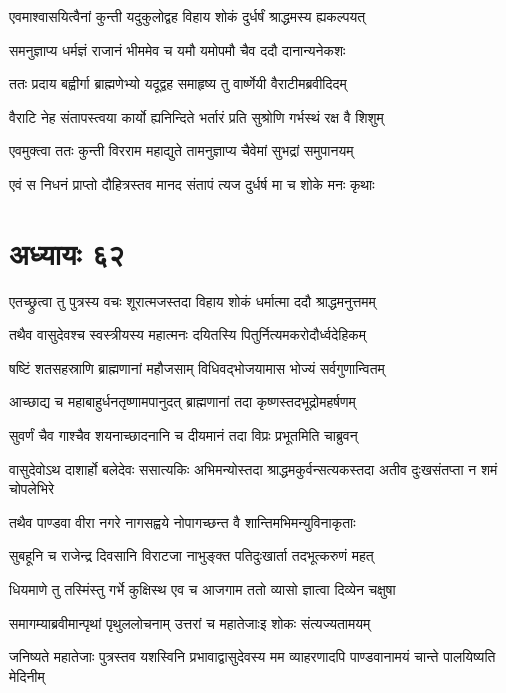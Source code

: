 \twolineshloka
{एवमाश्वासयित्वैनां कुन्ती यदुकुलोद्वह}
{विहाय शोकं दुर्धर्षं श्राद्धमस्य ह्यकल्पयत्}


\twolineshloka
{समनुज्ञाप्य धर्मज्ञं राजानं भीममेव च}
{यमौ यमोपमौ चैव ददौ दानान्यनेकशः}


\twolineshloka
{ततः प्रदाय बह्वीर्गा ब्राह्मणेभ्यो यदूद्वह}
{समाहृष्य तु वार्ष्णेयी वैराटीमब्रवीदिदम्}


\twolineshloka
{वैराटि नेह संतापस्त्वया कार्यो ह्यनिन्दिते}
{भर्तारं प्रति सुश्रोणि गर्भस्थं रक्ष वै शिशुम्}


\twolineshloka
{एवमुक्त्वा ततः कुन्ती विरराम महाद्युते}
{तामनुज्ञाप्य चैवेमां सुभद्रां समुपानयम्}


\twolineshloka
{एवं स निधनं प्राप्तो दौहित्रस्तव मानद}
{संतापं त्यज दुर्धर्ष मा च शोके मनः कृथाः}


\chapter{अध्यायः ६२}
\twolineshloka
{एतच्छ्रुत्वा तु पुत्रस्य वचः शूरात्मजस्तदा}
{विहाय शोकं धर्मात्मा ददौ श्राद्धमनुत्तमम्}


\twolineshloka
{तथैव वासुदेवश्च स्वस्त्रीयस्य महात्मनः}
{दयितस्यि पितुर्नित्यमकरोदौर्ध्वदेहिकम्}


\twolineshloka
{षष्टिं शतसहस्राणि ब्राह्मणानां महौजसाम्}
{विधिवद्भोजयामास भोज्यं सर्वगुणान्वितम्}


\twolineshloka
{आच्छाद्य च महाबाहुर्धनतृष्णामपानुदत्}
{ब्राह्मणानां तदा कृष्णस्तदभूद्रोमहर्षणम्}


\twolineshloka
{सुवर्णं चैव गाश्चैव शयनाच्छादनानि च}
{दीयमानं तदा विप्रः प्रभूतमिति चाब्रुवन्}


\threelineshloka
{वासुदेवोऽथ दाशार्हो बलेदेवः ससात्यकिः}
{अभिमन्योस्तदा श्राद्धमकुर्वन्सत्यकस्तदा}
{अतीव दुःखसंतप्ता न शमं चोपलेभिरे}


\twolineshloka
{तथैव पाण्डवा वीरा नगरे नागसह्वये}
{नोपागच्छन्त वै शान्तिमभिमन्युविनाकृताः}


\twolineshloka
{सुबहूनि च राजेन्द्र दिवसानि विराटजा}
{नाभुङ्क्त पतिदुःखार्ता तदभूत्करुणं महत्}


\twolineshloka
{धियमाणे तु तस्मिंस्तु गर्भे कुक्षिस्थ एव च}
{आजगाम ततो व्यासो ज्ञात्वा दिव्येन चक्षुषा}


\twolineshloka
{समागम्याब्रवीमान्पृथां पृथुललोचनाम्}
{उत्तरां च महातेजाःइ शोकः संत्यज्यतामयम्}


\threelineshloka
{जनिष्यते महातेजाः पुत्रस्तव यशस्विनि}
{प्रभावाद्वासुदेवस्य मम व्याहरणादपि}
{पाण्डवानामयं चान्ते पालयिष्यति मेदिनीम्}


